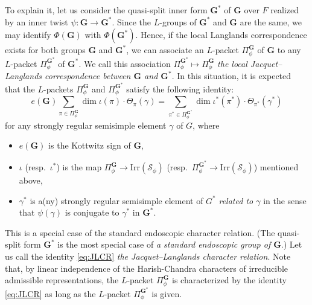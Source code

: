 \documentclass{amsart}
\newcommand{\bfG}{\mathbf{G}}
\theoremstyle{plain}
\theoremstyle{definition}
\theoremstyle{remark}
\theoremstyle{theorem}
\begin{document}
To explain it, let us consider the quasi-split inner form $\bfG^{\ast}$ of $\bfG$ over $F$ realized by an inner twist $\psi\colon\bfG\rightarrow\bfG^{\ast}$.
Since the $L$-groups of $\bfG^{\ast}$ and $\bfG$ are the same, we may identify $\Phi(\bfG)$ with $\Phi(\bfG^{\ast})$.
Hence, if the local Langlands correspondence exists for both groups $\bfG$ and $\bfG^{\ast}$, we can associate an $L$-packet $\Pi^{\bfG}_{\phi}$ of $\bfG$ to any $L$-packet $\Pi^{\bfG^{\ast}}_{\phi}$ of $\bfG^{\ast}$.
We call this association $\Pi^{\bfG^{\ast}}_{\phi}\mapsto\Pi^{\bfG}_{\phi}$ \textit{the local Jacquet--Langlands correspondence between $\bfG$ and $\bfG^{\ast}$}.
In this situation, it is expected that the $L$-packets $\Pi^{\bfG}_{\phi}$ and $\Pi^{\bfG^{\ast}}_{\phi}$ satisfy the following identity:
\[\label{eq:JLCR}
e(\bfG)\sum_{\pi\in\Pi^{\bfG}_{\phi}}\dim\iota(\pi)\cdot\Theta_{\pi}(\gamma)
=
\sum_{\pi^{\ast}\in\Pi^{\bfG^{\ast}}_{\phi}}\dim\iota^{\ast}(\pi^{\ast})\cdot \Theta_{\pi^{\ast}}(\gamma^{\ast})
\tag{JLCR}
\]
for any strongly regular semisimple element $\gamma$ of $G$, where 
\begin{itemize}
\item
$e(\bfG)$ is the Kottwitz sign of $\bfG$, 
\item
$\iota$ (resp.\ $\iota^{\ast}$) is the map $\Pi_{\phi}^{\bfG}\rightarrow\mathrm{Irr}(\mathcal{S}_{\phi})$ (resp.\ $\Pi_{\phi}^{\bfG^{\ast}}\rightarrow\mathrm{Irr}(\mathcal{S}_{\phi})$) mentioned above,
\item
$\gamma^{\ast}$ is a(ny) strongly regular semisimple element of $G^{\ast}$ \textit{related to $\gamma$} in the sense that $\psi(\gamma)$ is conjugate to $\gamma^{\ast}$ in $\bfG^{\ast}$.
\end{itemize}
This is a special case of the standard endoscopic character relation.
(The quasi-split form $\bfG^{\ast}$ is the most special case of \textit{a standard endoscopic group of $\bfG$}.)
Let us call the identity \eqref{eq:JLCR} \textit{the Jacquet--Langlands character relation}.
Note that, by linear independence of the Harish-Chandra characters of irreducible admissible representations, the $L$-packet $\Pi^{\bfG}_{\phi}$ is characterized by the identity \eqref{eq:JLCR} as long as the $L$-packet $\Pi^{\bfG^{\ast}}_{\phi}$ is given.
\end{document}
